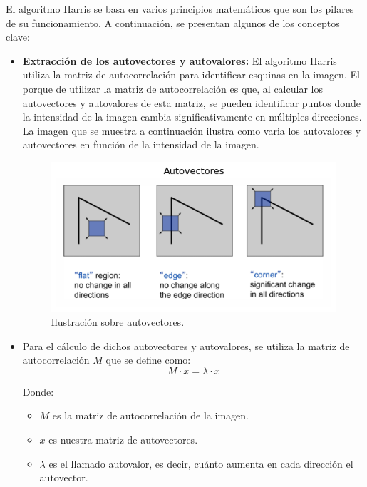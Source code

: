 \documentclass[a4paper]{article}
\begin{document}
  El algoritmo Harris se basa en varios principios matemáticos que son los pilares de su funcionamiento.
   A continuación, se presentan algunos de los conceptos clave:
  
  \begin{itemize}
      \item \textbf{Extracción de los autovectores y autovalores:}  
      El algoritmo Harris utiliza la matriz de autocorrelación para identificar esquinas en la imagen. El porque 
      de utilizar la matriz de autocorrelación es que, al calcular los autovectores y autovalores de esta matriz, se pueden identificar puntos donde la intensidad de la imagen cambia significativamente en múltiples direcciones.
      La imagen que se muestra a continuación ilustra como varia los autovalores y autovectores en función de la intensidad de la imagen.
      \begin{figure}[H]
        \centering
        \includegraphics[width=1.1\textwidth]{images/harris_autovectores.png}
        \caption{Ilustración sobre autovectores.}
        
    \end{figure}
      
    \item Para el cálculo de dichos autovectores y autovalores, se utiliza la matriz de autocorrelación \(M\) que se define como:
    \[
        M \cdot x = \lambda \cdot x
    \]
    
    Donde:
    \begin{itemize}
        \item \(M\) es la matriz de autocorrelación de la imagen.
        \item \(x\) es nuestra matriz de autovectores.
        \item \(\lambda\) es el llamado autovalor, es decir, cuánto aumenta en cada dirección el autovector.
    \end{itemize}


\end{itemize}
\end{document}
